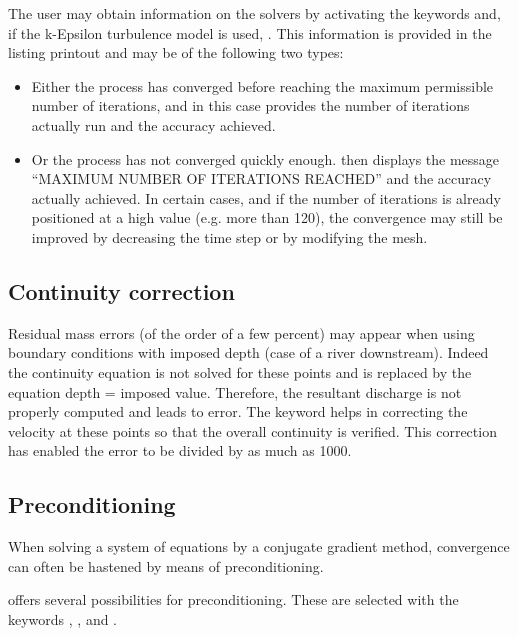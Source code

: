  The user may obtain information on the solvers by activating the keywords  and, if the k-Epsilon turbulence model is used,  . This information is provided in the listing printout and may be of the following two types:
\begin{itemize}
\item Either the process has converged before reaching the maximum permissible number of iterations, and in this case  provides the number of iterations actually run and the accuracy achieved.
\item Or the process has not converged quickly enough.  then displays the message ``MAXIMUM NUMBER OF ITERATIONS REACHED'' and the accuracy actually achieved. In certain cases, and if the number of iterations is already positioned at a high value (e.g. more than 120), the convergence may still be improved by decreasing the time step or by modifying the mesh.
\end{itemize}

\subsection{ Continuity correction}

 Residual mass errors (of the order of a few percent) may appear when using boundary conditions with imposed depth (case of a river downstream). Indeed the continuity equation is not solved for these points and is replaced by the equation depth = imposed value. Therefore, the resultant discharge is not properly computed and leads to error. The keyword  helps in correcting the velocity at these points so that the overall continuity is verified. This correction has enabled the error to be divided by as much as 1000.


\subsection{ Preconditioning}

 When solving a system of equations by a conjugate gradient method, convergence can often be hastened by means of preconditioning.

  offers several possibilities for preconditioning. These are selected with the keywords , , and .

